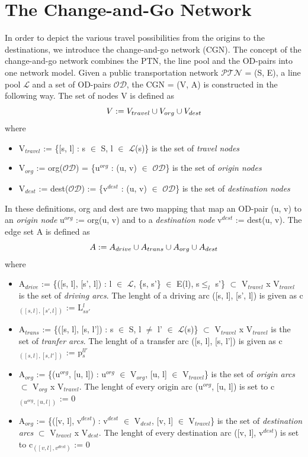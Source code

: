 \documentclass[
  twoside,
  11pt, a4paper,
  footinclude=true,
  headinclude=true,
  cleardoublepage=empty
]{scrbook}
\theoremstyle{definition}
\begin{document}
\section{The Change-and-Go Network}
In order to depict the various travel possibilities from the origins to the destinations, we introduce the change-and-go network (CGN). The concept of the change-and-go network combines the PTN, the line pool and the OD-pairs into one network model. \newline 
Given a public transportation network $\mathcal{PTN}$ = (S, E), a line pool $\mathcal{L}$ and a set of OD-pairs $\mathcal{OD}$, the CGN = (V, A) is constructed in the following way. \newline
The set of nodes V is defined as
\begin{equation} \notag
V := V_{travel} \cup V_{org} \cup V_{dest}
\end{equation}
where
\begin{itemize}
\item V$_{travel}$ := \{[s, l] : s $\in$ S, l $\in$ $\mathcal{L}$(s)\} is the set of \emph{travel nodes}
\item V$_{org}$ := org($\mathcal{OD}$) = \{u$^{org}$ : (u, v) $\in$ $\mathcal{OD}$\} is the set of \emph{origin nodes}
\item V$_{dest}$ := dest($\mathcal{OD}$) := \{v$^{dest}$ : (u, v) $\in$ $\mathcal{OD}$\} is the set of \emph{destination nodes}
\end{itemize}
In these definitions, org and dest are two mapping that map an OD-pair (u, v) to an \emph{origin node} u$^{org}$ := org(u, v) and to a \emph{destination node} v$^{dest}$ := dest(u, v). \newline
The edge set A is defined as
\begin{equation} \notag
A := A_{drive} \cup A_{trans} \cup A_{org} \cup A_{dest}
\end{equation}
where
\begin{itemize}
\item A$_{drive}$ := \{([s, l], [s', l]) : l $\in$ $\mathcal{L}$, \{s, s'\} $\in$ E(l), s$\le_{l}$ s'\} $\subset$ V$_{travel}$ x V$_{travel}$ is the set of \emph{driving arcs}. The lenght of a driving arc ([s, l], [s', l]) is given as c$_{([s, l], [s', l])}$ := L$^l_{ss'}$
\item A$_{trans}$ := \{([s, l], [s, l']) : s $\in$ S, l $\ne$ l' $\in$ $\mathcal{L}$(s)\} $\subset$ V$_{travel}$ x V$_{travel}$ is the set of \emph{tranfer arcs}. The lenght of a transfer arc ([s, l], [s, l'])  is given as c$_{([s, l], [s, l'])}$ := p$^{ll'}_s$
\item A$_{org}$ := \{(u$^{org}$, [u, l]) : u$^{org}$ $\in$  V$_{org}$, [u, l] $\in$ V$_{travel}$\} is the set of \emph{origin arcs} $\subset$ V$_{org}$ x V$_{travel}$. The lenght of every origin arc (u$^{org}$, [u, l]) is set to c$_{(u^{org}, [u, l])}$ := 0
\item A$_{org}$ := \{([v, l], v$^{dest}$) : v$^{dest}$ $\in$  V$_{dest}$, [v, l] $\in$ V$_{travel}$\} is the set of \emph{destination arcs} $\subset$ V$_{travel}$ x V$_{dest}$. The lenght of every destination arc ([v, l], v$^{dest}$) is set to c$_{([v, l], v^{dest})}$ := 0
\end{itemize} 
\end{document}
